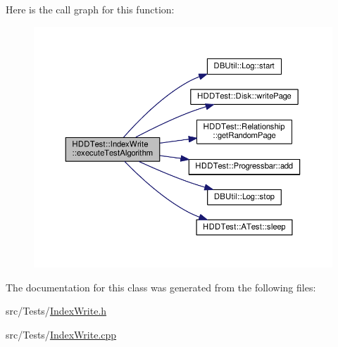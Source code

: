 Here is the call graph for this function\-:
\nopagebreak
\begin{figure}[H]
\begin{center}
\leavevmode
\includegraphics[width=350pt]{class_h_d_d_test_1_1_index_write_afe685020b557ab773d4804d290cc361b_cgraph}
\end{center}
\end{figure}




The documentation for this class was generated from the following files\-:\begin{DoxyCompactItemize}
\item 
src/\-Tests/\hyperlink{_index_write_8h}{Index\-Write.\-h}\item 
src/\-Tests/\hyperlink{_index_write_8cpp}{Index\-Write.\-cpp}\end{DoxyCompactItemize}
